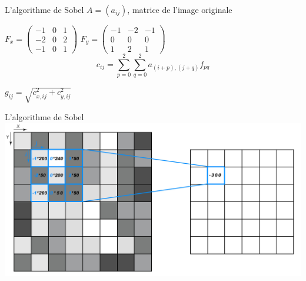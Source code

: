 \documentclass[ignorenonframetext,]{beamer}
\begin{document}
\begin{frame}{L'algorithme de Sobel}
	$A = (a_{ij})$, matrice de l'image originale \\
	\hspace*{10pt}

	$ F_x = \left(
	\begin{array}{ccc}
	-1 & 0 & 1 \\ 
	-2 & 0 & 2 \\ 
	-1 & 0 & 1
	\end{array} \right) $
	\hspace*{60pt}
	$ F_y = \left(
	\begin{array}{ccc}
	-1 & -2 & -1 \\ 
	0 & 0 & 0 \\ 
	1 & 2 & 1
	\end{array} \right) $\\
	\vspace*{20pt}
	\[ c_{ij} = \sum^2_{p=0} \sum^2_{q=0} a_{(i+p),(j+q)} {f}_{pq} \]
	\begin{center}
		$g_{ij} = \sqrt{c_{x,ij}^2 + c_{y,ij}^2}$
	\end{center}
\end{frame}

\begin{frame}{L'algorithme de Sobel}
	\includegraphics{conv.jpeg}
\end{frame}
\end{document}
